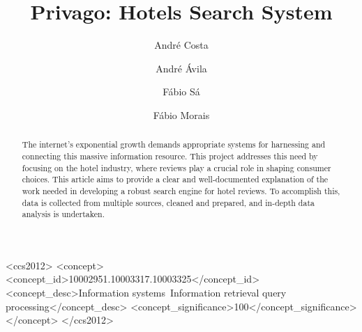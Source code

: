 \documentclass[sigconf]{acmart}
\begin{document}
\title{Privago: Hotels Search System}

\author{André Costa}

\author{André Ávila}

\author{Fábio Sá}

\author{Fábio Morais}


\begin{abstract}
  The internet's exponential growth demands appropriate systems for harnessing and connecting this massive information resource. This project addresses this need by focusing on the hotel industry, where reviews play a crucial role in shaping consumer choices. This article aims to provide a clear and well-documented explanation of the work needed in developing a robust search engine for hotel reviews. To accomplish this, data is collected from multiple sources, cleaned and prepared, and in-depth data analysis is undertaken.
\end{abstract}

\begin{CCSXML}
<ccs2012>
<concept>
<concept_id>10002951.10003317.10003325</concept_id>
<concept_desc>Information systems~Information retrieval query processing</concept_desc>
<concept_significance>100</concept_significance>
</concept>
</ccs2012>
\end{CCSXML}
\end{document}
